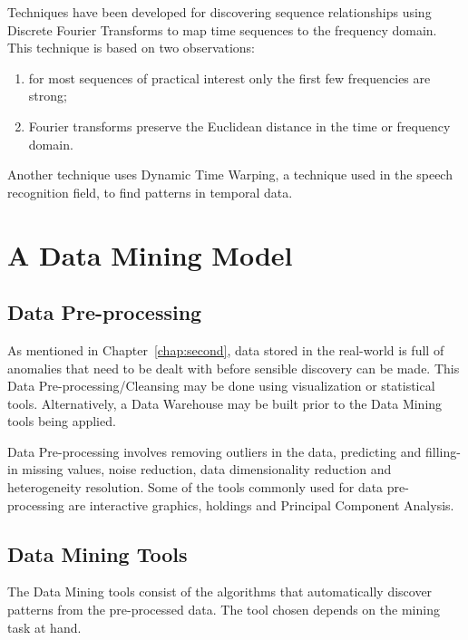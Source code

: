 \documentclass[a4paper,12pt,notitlepage,pdftex]{scrreprt}
\begin{document}
        Techniques have been developed for discovering sequence relationships using Discrete Fourier Transforms to map
        time sequences to the frequency domain.
        This technique is based on two observations:
        \begin{enumerate}
            \item for most sequences of practical interest only the first few frequencies are strong;
            \item Fourier transforms preserve the Euclidean distance in the time or frequency domain.
        \end{enumerate}

        Another technique uses Dynamic Time Warping, a technique used in the speech recognition field, to find
        patterns in temporal data.

\chapter{A Data Mining Model}
    \section{Data Pre-processing}
        As mentioned in Chapter~\ref{chap:second}, data stored in the real-world is full of anomalies that need to be
        dealt with before sensible discovery can be made.
        This Data Pre-processing/Cleansing may be done using visualization or statistical tools.
        Alternatively, a Data Warehouse may be built prior to the Data Mining tools being
        applied.

        Data Pre-processing involves removing outliers in the data, predicting and filling-in missing values, noise
        reduction, data dimensionality reduction and heterogeneity resolution.
        Some of the tools commonly used for data pre-processing are interactive graphics, holdings and Principal
        Component Analysis.

    \section{Data Mining Tools}
        The Data Mining tools consist of the algorithms that automatically discover patterns from the pre-processed
        data.
        The tool chosen depends on the mining task at hand.
\end{document}
